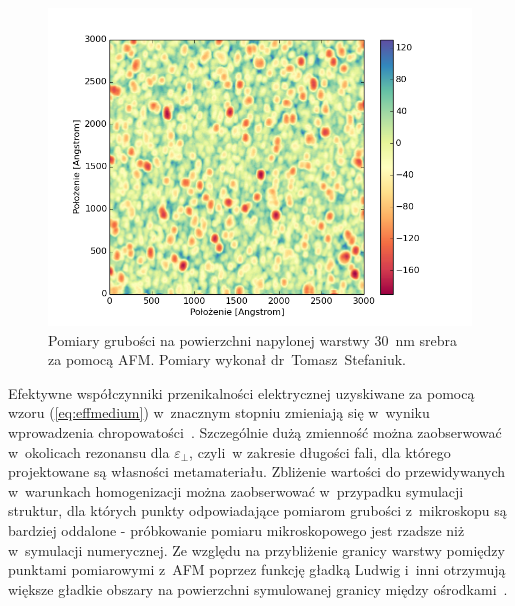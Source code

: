 \begin{figure}[bt]
		\includegraphics[width=\textwidth]{images/multilayer/ag30nm-afm-measure.png}
		\caption{Pomiary grubości na powierzchni napylonej warstwy $30$~nm srebra za pomocą AFM. Pomiary wykonał dr~Tomasz~Stefaniuk.} 
		\label{fig:ag30nm-afmmeasure}
\end{figure}


Efektywne współczynniki przenikalności elektrycznej uzyskiwane za pomocą wzoru (\ref{eq:effmedium}) w~znacznym stopniu zmieniają się w~wyniku wprowadzenia chropowatości~\cite{ludwig2012impact}. Szczególnie dużą zmienność można zaobserwować w~okolicach rezonansu dla $\varepsilon_{\perp}$, czyli~w zakresie długości fali, dla którego projektowane są własności metamateriału. Zbliżenie wartości do przewidywanych w~warunkach homogenizacji można zaobserwować w~przypadku symulacji struktur, dla których punkty odpowiadające pomiarom grubości z~mikroskopu są bardziej oddalone - próbkowanie pomiaru mikroskopowego jest rzadsze niż w~symulacji numerycznej. Ze względu na przybliżenie granicy warstwy pomiędzy punktami pomiarowymi z~AFM poprzez funkcję gładką Ludwig i~inni otrzymują większe gładkie obszary na powierzchni symulowanej granicy między ośrodkami~\cite{ludwig2012impact}. 

